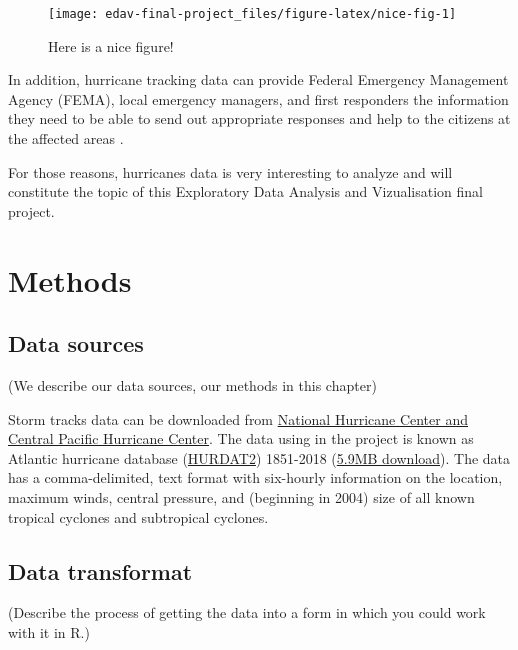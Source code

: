 \documentclass[]{book}
\begin{document}
\begin{figure}

{\centering \texttt{[image: edav-final-project\_files/figure-latex/nice-fig-1]} 

}

\caption{Here is a nice figure!}\label{fig:nice-fig}
\end{figure}

In addition, hurricane tracking data can provide Federal Emergency Management Agency (FEMA), local emergency managers, and first responders the information they need to be able to send out appropriate responses and help to the citizens at the affected areas \citep{Newtools4H2019}.

For those reasons, hurricanes data is very interesting to analyze and will constitute the topic of this Exploratory Data Analysis and Vizualisation final project.

\hypertarget{methods}{%
\chapter{Methods}\label{methods}}

\hypertarget{data-sources}{%
\section{Data sources}\label{data-sources}}

(We describe our data sources, our methods in this chapter)

Storm tracks data can be downloaded from \href{https://www.nhc.noaa.gov/data/\#hurdat}{National Hurricane Center and Central Pacific Hurricane Center}. The data using in the project is known as Atlantic hurricane database (\href{https://www.nhc.noaa.gov/data/hurdat/hurdat2-format-atlantic.pdf}{HURDAT2}) 1851-2018 (\href{https://www.nhc.noaa.gov/data/hurdat/hurdat2-1851-2018-051019.txt}{5.9MB download}). The data has a comma-delimited, text format with six-hourly information on the location, maximum winds, central pressure, and (beginning in 2004) size of all known tropical cyclones and subtropical cyclones.

\hypertarget{data-transformat}{%
\section{Data transformat}\label{data-transformat}}

(Describe the process of getting the data into a form in which you could work with it in R.)
\end{document}
